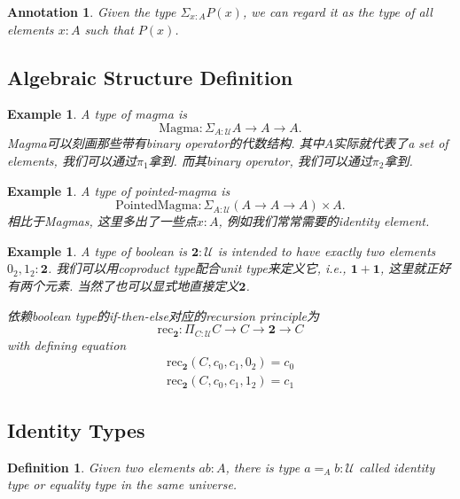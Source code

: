 \documentclass{article}
\newtheorem{example}[theorem]{Example}
\newtheorem{definition}[theorem]{Definition}
\newtheorem{annotation}[theorem]{Annotation}
\begin{document}
\begin{annotation}
\rm Given the type $\Sigma_{x : A} P(x)$, we can regard it as the type of all elements $x : A$ such that $P(x)$.
\end{annotation}

\subsection{Algebraic Structure Definition}

\begin{example}
\rm A type of magma is 
\[
    \text{Magma} : \Sigma_{A : \mathcal{U}} A \to A \to A.
\]
Magma可以刻画那些带有binary operator的代数结构. 其中$A$实际就代表了a set of elements, 我们可以通过$\pi_1$拿到. 而其binary operator, 我们可以通过$\pi_2$拿到.
\end{example}

\begin{example}
\rm A type of pointed-magma is 
\[
    \text{PointedMagma} : \Sigma_{A : \mathcal{U}} (A \to A \to A) \times A.
\]
相比于Magmas, 这里多出了一些点$x : A$, 例如我们常常需要的identity element.
\end{example}

\begin{example}
\rm A type of boolean is $\mathbf{2} : \mathcal{U}$ is intended to have exactly two elements $0_{2}, 1_2 : \mathbf{2}$. 我们可以用coproduct type配合unit type来定义它, i.e., $\mathbf{1} + \mathbf{1}$, 这里就正好有两个元素. 当然了也可以显式地直接定义$\mathbf{2}$.

依赖boolean type的if-then-else对应的recursion principle为
\[
    \text{rec}_{\mathbf{2}} : \Pi_{C : \mathcal{U}} C \to C \to \mathbf{2} \to C 
\]
with defining equation
\[
    \begin{aligned}
    \text{rec}_{\mathbf{2}}(C, c_0, c_1, 0_2) = c_0 \\
    \text{rec}_{\mathbf{2}}(C, c_0, c_1, 1_2) = c_1  
    \end{aligned}
\]
\end{example}

\subsection{Identity Types}

\begin{definition}
\rm Given two elements $a b : A$, there is type $a =_A b : \mathcal{U}$ called \emph{identity type} or \emph{equality type} in the same universe.
\end{definition}
\end{document}
